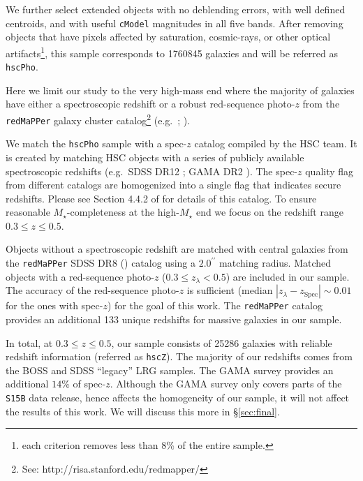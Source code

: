 \documentclass[a4paper,fleqn,usenatbib]{mnras}
\def\arcsec{{\prime\prime}}
\def\redm{\texttt{redMaPPer}}
\def\mstar{{$M_{\star}$}}
\begin{document}
    We further select extended objects with no deblending errors, with well defined 
    centroids, and with useful \texttt{cModel} magnitudes in all five bands. 
    After removing objects that have pixels affected by saturation, cosmic-rays, or 
    other optical artifacts\footnote{each criterion removes less than 8\% of the 
    entire sample.}, this sample corresponds to 1760845 galaxies and will be referred 
    as \texttt{hscPho}. 
        
    Here we limit our study to the very high-mass end where the majority of galaxies 
    have either a spectroscopic redshift or a robust red-sequence photo-$z$ from the 
    \redm{} galaxy cluster catalog\footnote{See: http://risa.stanford.edu/redmapper/} 
    (e.g.\ \citealt{Rykoff2014}; \citealt{Rozo2015b}).  

    We match the \texttt{hscPho} sample with a spec-$z$ catalog compiled by the HSC 
    team.
    It is created by matching HSC objects with a series of publicly available 
    spectroscopic redshifts (e.g.\ SDSS DR12 \citealt{SDSSDR12}; 
    GAMA DR2 \citealt{Liske2015}). 
    The spec-$z$ quality flag from different catalogs are homogenized into a single 
    flag that indicates secure redshifts.
    Please see Section 4.4.2 of \citet{HSC_DR1} for details of this catalog.  
    To ensure reasonable \mstar{}-completeness at the high-\mstar{} end we focus on
    the redshift range $0.3 \leq z \leq 0.5$. 
   
    Objects without a spectroscopic redshift are matched with central 
    galaxies from the \redm{} SDSS DR8 (\citealt{Rykoff2014}) catalog using a 
    $2.0^{\arcsec}$ matching radius. 
    Matched objects with a red-sequence photo-$z$ ($0.3 \leq z_{\lambda} < 0.5$) are 
    included in our sample. 
    The accuracy of the red-sequence photo-$z$ is sufficient (median 
    $|z_{\lambda} - z_{\mathrm{Spec}}| {\sim} 0.01$ for the ones with spec-$z$) 
    for the goal of this work.
    The \redm{} catalog provides an additional 133 unique redshifts for massive 
    galaxies in our sample.
        
    In total, at $0.3 \leq z \leq 0.5$, our sample consists of 25286 galaxies with 
    reliable redshift information (referred as \texttt{hscZ}).
    The majority of our redshifts comes from the BOSS and SDSS ``legacy'' LRG samples. 
    The GAMA survey provides an additional $14$\% of spec-$z$.
    Although the GAMA survey only covers parts of the \texttt{S15B} data release, 
    hence affects the homogeneity of our sample, it will not affect the results of 
    this work.
    We will discuss this more in \S \ref{sec:final}.
\end{document}
